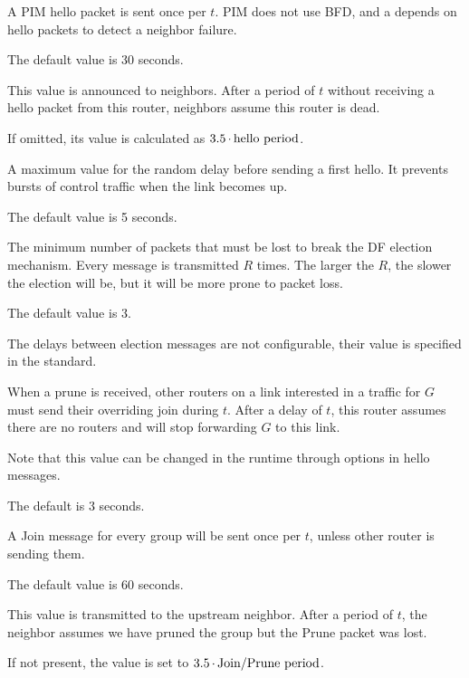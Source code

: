 \begin{description}[style=nextline]
\item[Hello period $t$]
  A PIM hello packet is sent once per $t$. PIM does not use BFD, and a depends
  on hello packets to detect a neighbor failure.

  The default value is 30 seconds.

\item[Hello holdtime $t$]
  This value is announced to neighbors. After a period of $t$ without receiving
  a hello packet from this router, neighbors assume this router is dead.

  If omitted, its value is calculated as $3.5\mathop{\cdot}\hbox{hello period}$.

\item[Hello delay $t$]
  A maximum value for the random delay before sending a first hello. It
  prevents bursts of control traffic when the link becomes up.

  The default value is 5 seconds.

\item[Election robustness $R$]
  The minimum number of packets that must be lost to break the DF election
  mechanism. Every message is transmitted $R$ times. The larger the $R$, the
  slower the election will be, but it will be more prone to packet loss.

  The default value is 3.

  The delays between election messages are not configurable, their value is
  specified in the standard.

\item[Override interval $t$]
  When a prune is received, other routers on a link interested in a traffic for
  $G$ must send their overriding join during $t$. After a delay of $t$, this
  router assumes there are no routers and will stop forwarding $G$ to this
  link.

  Note that this value can be changed in the runtime through options in hello
  messages.

  The default is 3 seconds.

\item[Join/Prune period $t$]
  A Join message for every group will be sent once per $t$, unless other router
  is sending them.

  The default value is 60 seconds.

\item[Join/Prune holdtime $t$]
  This value is transmitted to the upstream neighbor. After a period of $t$,
  the neighbor assumes we have pruned the group but the Prune packet was
  lost.

  If not present, the value is set to $3.5\mathop{\cdot}\hbox{Join/Prune
  period}$.
\end{description}

